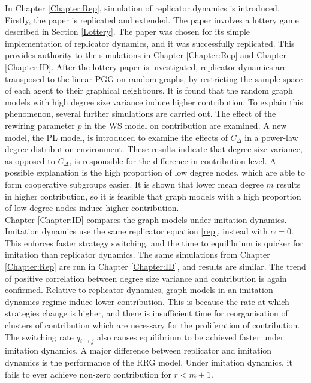 In Chapter \ref{Chapter:Rep}, simulation of replicator dynamics is introduced. Firstly, the paper \cite{RN30} is replicated and extended. The paper involves a lottery game described in Section \ref{Lottery}. The paper was chosen for its simple implementation of replicator dynamics, and it was successfully replicated. This provides authority to the simulations in Chapter \ref{Chapter:Rep} and Chapter \ref{Chapter:ID}. After the lottery paper is investigated, replicator dynamics are transposed to the linear PGG on random graphs, by restricting the sample space of each agent to their graphical neighbours. It is found that the random graph models with high degree size variance induce higher contribution. To explain this phenomenon, several further simulations are carried out. The effect of the rewiring parameter $p$ in the WS model on contribution are examined. A new model, the PL model, is introduced to examine the effects of $C_\Delta$ in a power-law degree distribution environment. These results indicate that degree size variance, as opposed to $C_\Delta$, is responsible for the difference in contribution level. A possible explanation is the high proportion of low degree nodes, which are able to form cooperative subgroups easier. It is shown that lower mean degree $m$ results in higher contribution, so it is feasible that graph models with a high proportion of low degree nodes induce higher contribution.  \\

Chapter \ref{Chapter:ID} compares the graph models under imitation dynamics. Imitation dynamics use the same replicator equation \eqref{rep}, instead with $\alpha=0$. This enforces faster strategy switching, and the time to equilibrium is quicker for imitation than replicator dynamics. The same simulations from Chapter \ref{Chapter:Rep} are run in Chapter \ref{Chapter:ID}, and results are similar. The trend of positive correlation between degree size variance and contribution is again confirmed. Relative to replicator dynamics, graph models in an imitation dynamics regime induce lower contribution. This is because the rate at which strategies change is higher, and there is insufficient time for reorganisation of clusters of contribution which are necessary for the proliferation of contribution. The switching rate $q_{i \to j}$ also causes equilibrium to be achieved faster under imitation dynamics. A major difference between replicator and imitation dynamics is the performance of the RRG model. Under imitation dynamics, it fails to ever achieve non-zero contribution for $r<m+1$. 


